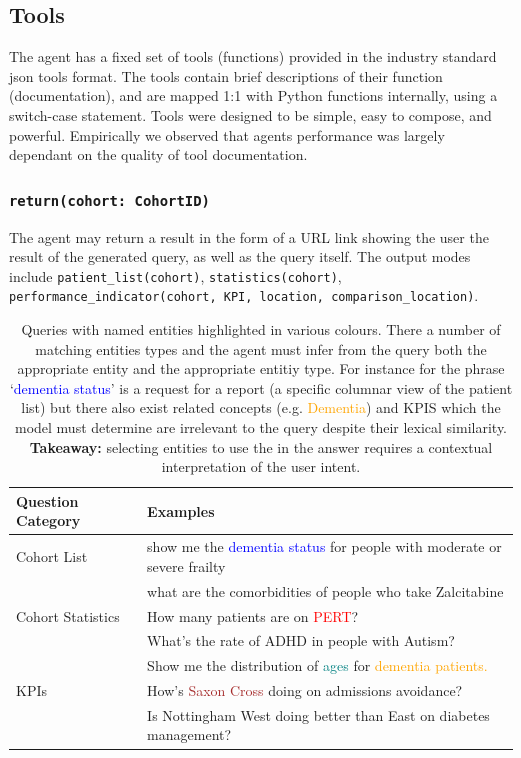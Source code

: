 \documentclass[11pt]{article}
\begin{document}
\subsection{Tools}
The agent has a fixed set of tools (functions) provided in the industry standard json tools format.
The tools contain brief descriptions of their function (documentation), and are mapped 1:1 with Python functions internally, using a switch-case statement.
Tools were designed to be simple, easy to compose, and powerful. Empirically we observed that agents performance was largely dependant on the quality of tool documentation.

\subsubsection*{\texttt{return(cohort: CohortID)}}
The agent may return a result in the form of a URL link showing the user the result of the generated query, as well as the query itself.
The output modes include \texttt{patient\_list(cohort)}, \texttt{statistics(cohort)}, \texttt{performance\_indicator(cohort, KPI, location, comparison\_location)}.

\begin{table}[t]
\centering
\begin{tabular}{|p{2cm}|p{5cm}|}
\hline
	Question Category & Examples \\
\hline
\hline
	Cohort List	& show me the \textcolor{blue}{dementia status} for people with moderate or severe frailty \\
			& what are the comorbidities of people who take Zalcitabine \\ 
\hline
	Cohort Statistics 	& How many patients are on \textcolor{red}{PERT}? \\
				& What's the rate of ADHD in people with Autism? \\
				& Show me the distribution of \textcolor{teal}{ages} for \textcolor{orange}{dementia patients.} \\
\hline
	KPIs 	& How's \textcolor{brown}{Saxon Cross} doing on admissions avoidance? \\
		& Is Nottingham West doing better than East on diabetes management? \\
\hline
\end{tabular}
\caption{
	Queries with named entities highlighted in various colours.
	There a number of matching entities types and the agent must infer from the query both the appropriate entity and the appropriate entitiy type.
	For instance for the phrase `\textcolor{blue}{dementia status}' is a request for a report (a specific columnar view of the patient list) but there also exist related
	concepts (e.g. \textcolor{orange}{Dementia}) and KPIS which the model must determine are irrelevant to the query despite their lexical similarity.
	\\ \textbf{Takeaway:} selecting entities to use the in the answer requires a contextual interpretation of the user intent.  
}
\label{tab:sample-queries}
\end{table}
\end{document}
